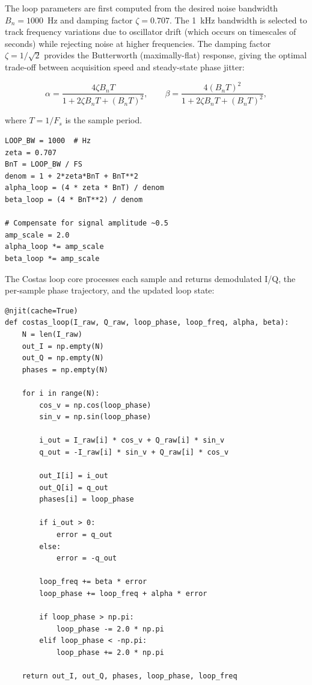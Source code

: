 \documentclass{article}
\begin{document}
The loop parameters are first computed from the desired noise bandwidth $B_n = 1000$~Hz and damping factor $\zeta = 0.707$. The 1~kHz bandwidth is selected to track frequency variations due to oscillator drift (which occurs on timescales of seconds) while rejecting noise at higher frequencies. The damping factor $\zeta = 1/\sqrt{2}$ provides the Butterworth (maximally-flat) response, giving the optimal trade-off between acquisition speed and steady-state phase jitter:

\begin{equation}
\alpha = \frac{4 \zeta B_n T}{1 + 2\zeta B_n T + (B_n T)^2}, \qquad
\beta = \frac{4 (B_n T)^2}{1 + 2\zeta B_n T + (B_n T)^2},
\end{equation}

where $T = 1/F_s$ is the sample period.

\begin{verbatim}
LOOP_BW = 1000  # Hz
zeta = 0.707
BnT = LOOP_BW / FS
denom = 1 + 2*zeta*BnT + BnT**2
alpha_loop = (4 * zeta * BnT) / denom
beta_loop = (4 * BnT**2) / denom

# Compensate for signal amplitude ~0.5
amp_scale = 2.0
alpha_loop *= amp_scale
beta_loop *= amp_scale
\end{verbatim}

The Costas loop core processes each sample and returns demodulated I/Q, the per-sample phase trajectory, and the updated loop state:

\begin{verbatim}
@njit(cache=True)
def costas_loop(I_raw, Q_raw, loop_phase, loop_freq, alpha, beta):
    N = len(I_raw)
    out_I = np.empty(N)
    out_Q = np.empty(N)
    phases = np.empty(N)

    for i in range(N):
        cos_v = np.cos(loop_phase)
        sin_v = np.sin(loop_phase)

        i_out = I_raw[i] * cos_v + Q_raw[i] * sin_v
        q_out = -I_raw[i] * sin_v + Q_raw[i] * cos_v

        out_I[i] = i_out
        out_Q[i] = q_out
        phases[i] = loop_phase

        if i_out > 0:
            error = q_out
        else:
            error = -q_out

        loop_freq += beta * error
        loop_phase += loop_freq + alpha * error

        if loop_phase > np.pi:
            loop_phase -= 2.0 * np.pi
        elif loop_phase < -np.pi:
            loop_phase += 2.0 * np.pi

    return out_I, out_Q, phases, loop_phase, loop_freq
\end{verbatim}
\end{document}
